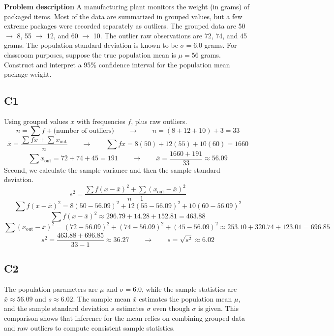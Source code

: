 \begin{ExamProblems}
		\newpage
		\item
		\textbf{Problem description}
		A manufacturing plant monitors the weight (in grams) of packaged items.
		Most of the data are summarized in grouped values, but a few extreme packages were recorded separately as outliers.
		The grouped data are 50 $\rightarrow$ 8, 55 $\rightarrow$ 12, and 60 $\rightarrow$ 10.
		The outlier raw observations are 72, 74, and 45 grams.
		The population standard deviation is known to be \(\sigma = 6.0\) grams.
		For classroom purposes, suppose the true population mean is \(\mu = 56\) grams.
		Construct and interpret a 95\% confidence interval for the population mean package weight.

		\subsection*{C1}
		Using grouped values $x$ with frequencies $f$, plus raw outliers.
		\[
		n = \sum f + \text{(number of outliers)} \qquad \longrightarrow \qquad n = (8 + 12 + 10) + 3 = 33
		\]
		\[
		\bar{x} = \frac{\sum f x + \sum x_{\text{out}}}{n} \qquad \longrightarrow \qquad \sum f x = 8(50) + 12(55) + 10(60) = 1660
		\]
		\[
		\sum x_{\text{out}} = 72 + 74 + 45 = 191 \qquad \longrightarrow \qquad \bar{x} = \frac{1660 + 191}{33} \approx 56.09
		\]
		Second, we calculate the sample variance and then the sample standard deviation.
		\[
		s^2 = \frac{\sum f(x-\bar{x})^2 + \sum (x_{\text{out}}-\bar{x})^2}{n-1}
		\]
		\[
		\sum f(x-\bar{x})^2 = 8(50-56.09)^2 + 12(55-56.09)^2 + 10(60-56.09)^2
		\]
		\[
		\sum f(x-\bar{x})^2 \approx 296.79 + 14.28 + 152.81 = 463.88
		\]
		\[
		\sum (x_{\text{out}}-\bar{x})^2 = (72-56.09)^2 + (74-56.09)^2 + (45-56.09)^2 \approx 253.10 + 320.74 + 123.01 = 696.85
		\]
		\[
		s^2 = \frac{463.88 + 696.85}{33-1} \approx 36.27 \qquad \longrightarrow \qquad s = \sqrt{s^2} \approx 6.02
		\]

		\subsection*{C2}
		The population parameters are $\mu$ and $\sigma = 6.0$, while the sample statistics are $\bar{x} \approx 56.09$ and $s \approx 6.02$. The sample mean $\bar{x}$ estimates the population mean $\mu$, and the sample standard deviation $s$ estimates $\sigma$ even though $\sigma$ is given. This comparison shows that inference for the mean relies on combining grouped data and raw outliers to compute consistent sample statistics.


\end{ExamProblems}
